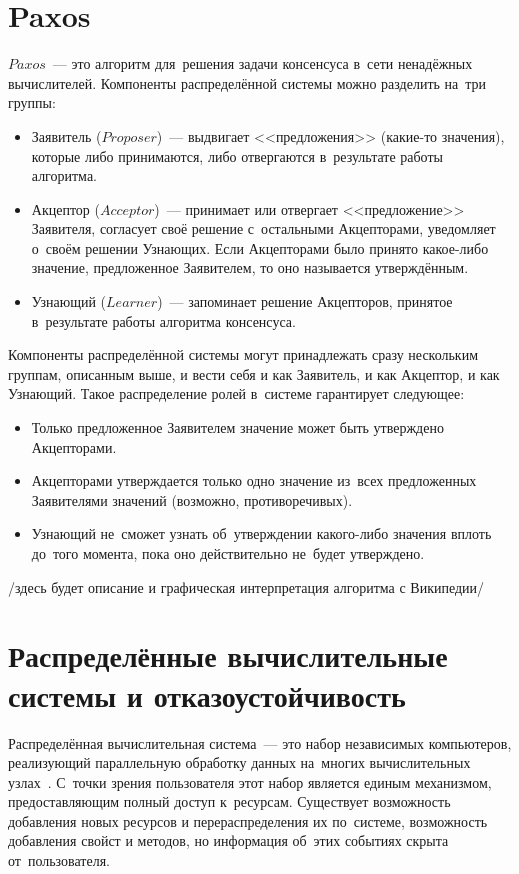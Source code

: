 \section{Paxos}\label{sec:2}
$Paxos$~--- это алгоритм для~решения задачи консенсуса в~сети ненадёжных вычислителей. Компоненты распределённой системы можно разделить на~три группы:
\begin{itemize}
	\item Заявитель ($Proposer$)~--- выдвигает <<предложения>> (какие-то значения), которые либо принимаются, либо отвергаются в~результате работы алгоритма.
	\item Акцептор ($Acceptor$)~--- принимает или отвергает <<предложение>> Заявителя, согласует своё решение с~остальными Акцепторами, уведомляет о~своём решении Узнающих. Если Акцепторами было принято какое-либо значение, предложенное Заявителем, то оно называется утверждённым.
	\item Узнающий ($Learner$)~--- запоминает решение Акцепторов, принятое в~результате работы алгоритма консенсуса.
\end{itemize}

Компоненты распределённой системы могут принадлежать сразу нескольким группам, описанным выше, и вести себя и как Заявитель, и как Акцептор, и как Узнающий. Такое распределение ролей в~системе гарантирует следующее:
\begin{itemize}
	\item Только предложенное Заявителем значение может быть утверждено Акцепторами.
	\item Акцепторами утверждается только одно значение из~всех предложенных Заявителями значений (возможно, противоречивых).
	\item Узнающий не~сможет узнать об~утверждении какого-либо значения вплоть до~того момента, пока оно действительно не~будет утверждено.
\end{itemize}

/здесь будет описание и графическая интерпретация алгоритма с Википедии/
\fi




\section{Распределённые вычислительные системы и отказоустойчивость}\label{sec:1}
Распределённая вычислительная система~--- это набор независимых компьютеров, реализующий параллельную обработку данных на~многих вычислительных узлах~\autocite{Tanenbaum}. С~точки зрения пользователя этот набор является единым механизмом, предоставляющим полный доступ к~ресурсам. Существует возможность добавления новых ресурсов и перераспределения их по~системе, возможность добавления свойст и методов, но информация об~этих событиях скрыта от~пользователя.

